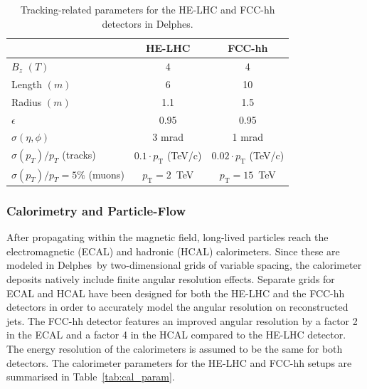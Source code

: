 \documentclass[a4paper,11pt]{article}
\newcommand{\pt}{\ensuremath{p_{\text{T}}}}
\newcommand{\delphes}{{\sc Delphes}}
\begin{document}
\begin {table}[htb!]
\begin{center}
\begin{tabular}{l||c|c}
& HE-LHC & FCC-hh \\
  \hline
  \hline
$B_z$ $(T)$ &  4 & 4 \\
  \hline
Length $(m)$ & 6 & 10 \\
 \hline
Radius $(m)$ & 1.1 &  1.5 \\
 \hline
$\epsilon$ & 0.95 & 0.95\\
\hline
$\sigma(\eta,\phi)$ & 3 mrad & 1 mrad \\
\hline
$\sigma(p_T)/p_T$ (tracks) &  $0.1\cdot \pt$ (TeV/c) &  $0.02\cdot \pt$ (TeV/c)\\
\hline
$\sigma(p_T)/p_T=5\%$ (muons) & $\pt=2$~TeV & $\pt=15$~TeV\\

\end{tabular}
\caption{Tracking-related parameters for the HE-LHC and FCC-hh detectors in Delphes.}
\label{tab:trk_param}
\end{center}
\end{table}


\subsubsection{Calorimetry and Particle-Flow}
\label{appsub:calorimetry}

After propagating within the magnetic field, long-lived particles reach the electromagnetic (ECAL) and hadronic (HCAL) calorimeters. Since these are modeled in \delphes{}~by two-dimensional grids of variable spacing, the calorimeter deposits natively include finite angular resolution effects. Separate grids for ECAL and HCAL have been designed for both the HE-LHC and the FCC-hh detectors in order to accurately model the angular resolution on reconstructed jets. The FCC-hh detector features an improved angular resolution by a factor 2 in the ECAL and a factor 4 in the HCAL compared to the HE-LHC detector. The energy resolution of the calorimeters is assumed to be the same for both detectors. The calorimeter parameters for the HE-LHC and FCC-hh setups are summarised in Table~\ref{tab:cal_param}.
\end{document}
